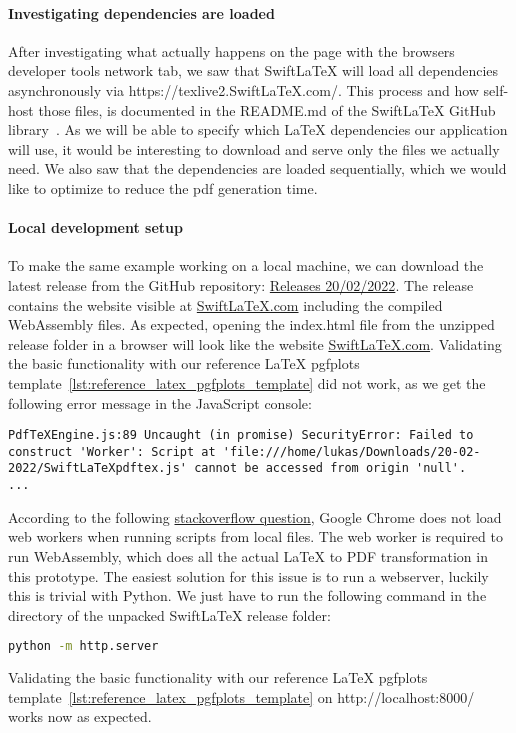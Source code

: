 \paragraph{Investigating dependencies are loaded}\mbox{}\newline
After investigating what actually happens on the page with the browsers developer tools network tab, we saw that SwiftLaTeX will load all dependencies asynchronously via https://texlive2.SwiftLaTeX.com/.
This process and how self-host those files, is documented in the README.md of the SwiftLaTeX GitHub library~\cite{SwiftLaTeX_github_repository}.
As we will be able to specify which LaTeX dependencies our application will use, it would be interesting to download and serve only the files we actually need.
We also saw that the dependencies are loaded sequentially, which we would like to optimize to reduce the pdf generation time.

\paragraph{Local development setup}\mbox{}\newline
To make the same example working on a local machine, we can download the latest release from the GitHub repository: \href{https://github.com/SwiftLaTeX/SwiftLaTeX/releases/tag/v20022022}{Releases 20/02/2022}.
The release contains the website visible at \href{https://www.SwiftLaTeX.com/}{SwiftLaTeX.com} including the compiled WebAssembly files.
As expected, opening the index.html file from the unzipped release folder in a browser will look like the website \href{https://www.SwiftLaTeX.com/}{SwiftLaTeX.com}.
Validating the basic functionality with our reference LaTeX pgfplots template~\ref{lst:reference_latex_pgfplots_template} did not work, as we get the following error message in the JavaScript console:
\begin{lstlisting}[caption={SwiftLaTeX local development setup: JavaScript error message},label={lst:SwiftLaTeX_local_setup_js_error}]
PdfTeXEngine.js:89 Uncaught (in promise) SecurityError: Failed to construct 'Worker': Script at 'file:///home/lukas/Downloads/20-02-2022/SwiftLaTeXpdftex.js' cannot be accessed from origin 'null'.
...
\end{lstlisting}

According to the following \href{https://stackoverflow.com/questions/21408510/chrome-cant-load-web-worker}{stackoverflow question}, Google Chrome does not load web workers when running scripts from local files.
The web worker is required to run WebAssembly, which does all the actual LaTeX to PDF transformation in this prototype.
The easiest solution for this issue is to run a webserver, luckily this is trivial with Python.
We just have to run the following command in the directory of the unpacked SwiftLaTeX release folder:
\begin{lstlisting}[caption={Start a webserver on http://localhost:8000/ with Python},language=bash,label={lst:lstlisting}]
python -m http.server
\end{lstlisting}
Validating the basic functionality with our reference LaTeX pgfplots template~\ref{lst:reference_latex_pgfplots_template} on http://localhost:8000/ works now as expected.

